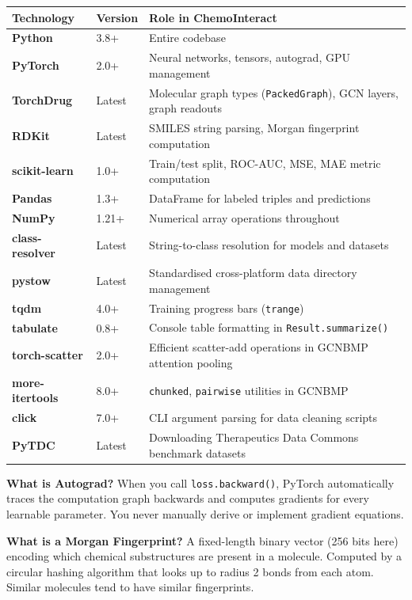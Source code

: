 \documentclass[12pt,a4paper,oneside]{book}
\begin{document}
\begin{longtable}{>{\bfseries}p{3cm}p{2.5cm}p{9cm}}
\toprule
\textbf{Technology} & \textbf{Version} & \textbf{Role in ChemoInteract} \\
\midrule\endhead
Python       & 3.8+   & Entire codebase \\
PyTorch      & 2.0+   & Neural networks, tensors, autograd, GPU management \\
TorchDrug    & Latest & Molecular graph types (\texttt{PackedGraph}), GCN layers, graph readouts \\
RDKit        & Latest & SMILES string parsing, Morgan fingerprint computation \\
scikit-learn & 1.0+   & Train/test split, ROC-AUC, MSE, MAE metric computation \\
Pandas       & 1.3+   & DataFrame for labeled triples and predictions \\
NumPy        & 1.21+  & Numerical array operations throughout \\
class-resolver & Latest & String-to-class resolution for models and datasets \\
pystow       & Latest & Standardised cross-platform data directory management \\
tqdm         & 4.0+   & Training progress bars (\texttt{trange}) \\
tabulate     & 0.8+   & Console table formatting in \texttt{Result.summarize()} \\
torch-scatter & 2.0+  & Efficient scatter-add operations in GCNBMP attention pooling \\
more-itertools & 8.0+ & \texttt{chunked}, \texttt{pairwise} utilities in GCNBMP \\
click        & 7.0+   & CLI argument parsing for data cleaning scripts \\
PyTDC        & Latest & Downloading Therapeutics Data Commons benchmark datasets \\
\bottomrule
\end{longtable}

\begin{tcolorbox}[notebox]
\textbf{What is Autograd?} When you call \texttt{loss.backward()}, PyTorch automatically traces the computation graph backwards and computes gradients for every learnable parameter. You never manually derive or implement gradient equations.
\end{tcolorbox}

\begin{tcolorbox}[notebox]
\textbf{What is a Morgan Fingerprint?} A fixed-length binary vector (256 bits here) encoding which chemical substructures are present in a molecule. Computed by a circular hashing algorithm that looks up to radius 2 bonds from each atom. Similar molecules tend to have similar fingerprints.
\end{tcolorbox}
\end{document}
